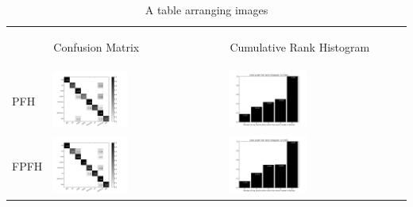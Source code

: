 \begin{table}
\centering
\begin{tabular}{m{} m{} m{}}
     & \begin{center} Confusion Matrix \end{center} & \begin{center} Cumulative Rank Histogram \end{center} \\
  {\large PFH} & \includegraphics[width=0.45\textwidth,clip=true]{../figures/PFH_confmat.png} & \includegraphics[width=0.45\textwidth,clip=true]{../figures/PFH_rankhist.png} \\
  {\large FPFH} & \includegraphics[width=0.45\textwidth,clip=true]{../figures/FPFH_confmat.png} & \includegraphics[width=0.45\textwidth,clip=true]{../figures/FPFH_rankhist.png} \\
\end{tabular}
\caption{A table arranging images}
\label{tab:gt}
\end{table}

